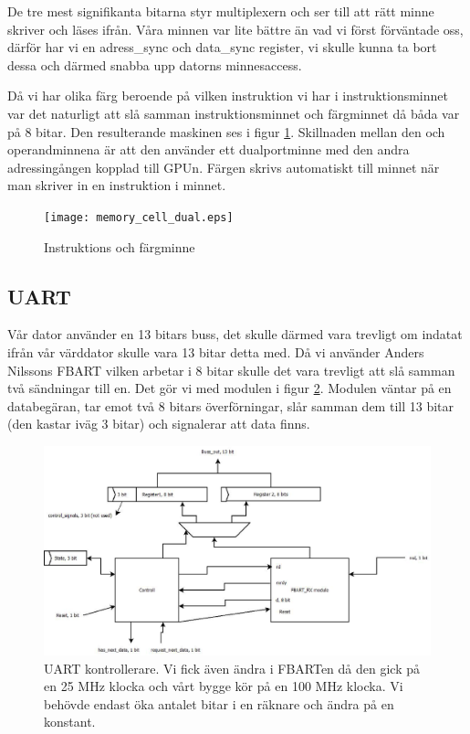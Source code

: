 \documentclass[11pt]{article}
\begin{document}
De tre mest signifikanta bitarna styr multiplexern och ser till att rätt minne skriver och läses ifrån. Våra minnen var lite bättre än vad vi först förväntade oss, därför har vi en adress\_sync och data\_sync register, vi skulle kunna ta bort dessa och därmed snabba upp datorns minnesaccess.

Då vi har olika färg beroende på vilken instruktion vi har i instruktionsminnet var det naturligt att slå samman instruktionsminnet och färgminnet då båda var på 8 bitar. Den resulterande maskinen ses i figur \ref{fig:memory_cell_dual}. Skillnaden mellan den och operandminnena är att den använder ett dualportminne med den andra adressingången kopplad till GPUn. Färgen skrivs automatiskt till minnet när man skriver in en instruktion i minnet.

\begin{figure}[h]
    \begin{center}
        \texttt{[image: memory\_cell\_dual.eps]}
        \caption{Instruktions och färgminne}
        \label{fig:memory_cell_dual}
    \end{center}
\end{figure}

\newpage
\subsection{UART}

Vår dator använder en 13 bitars buss, det skulle därmed vara trevligt om indatat ifrån vår värddator skulle vara 13 bitar detta med. Då vi använder Anders Nilssons FBART vilken arbetar i 8 bitar skulle det vara trevligt att slå samman två sändningar till en. Det gör vi med modulen i figur \ref{fig:uart}. Modulen väntar på en databegäran, tar emot två 8 bitars överförningar, slår samman dem till 13 bitar (den kastar iväg 3 bitar) och signalerar att data finns.

\begin{figure}[h]
    \begin{center}
        \includegraphics[width=13cm]{uart.eps}
        \caption{UART kontrollerare. Vi fick även ändra i FBARTen då den gick på en 25 MHz klocka och vårt bygge kör på en 100 MHz klocka. Vi behövde endast öka antalet bitar i en räknare och ändra på en konstant.}
        \label{fig:uart}
    \end{center}
\end{figure}
\end{document}
